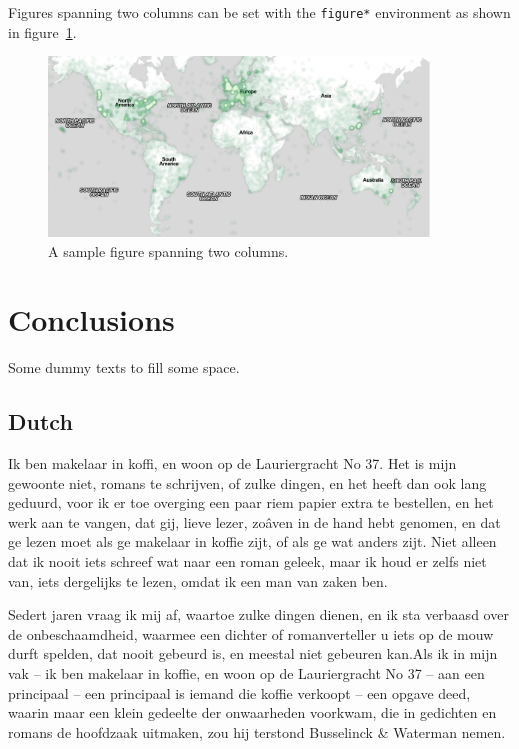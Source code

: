 \documentclass[sigconf]{acmart}
\begin{document}
Figures spanning two columns can be set with the \texttt{figure*} environment as shown in figure~\ref{fig:map2}.

\begin{figure}[tb]
\centering
\includegraphics[width=0.9\textwidth]{map.png}
\caption{A sample figure spanning two columns.}
\label{fig:map2}
\end{figure}


\section{Conclusions}
Some dummy texts to fill some space.

\subsection{Dutch}
Ik ben makelaar in koffi, en woon op de Lauriergracht No 37. Het is mijn gewoonte niet, romans te schrijven, of zulke dingen, en het heeft dan ook lang geduurd, voor ik er toe overging een paar riem papier extra te bestellen, en het werk aan te vangen, dat gij, lieve lezer, zoâven in de hand hebt genomen, en dat ge lezen moet als ge makelaar in koffie zijt, of als ge wat anders zijt. Niet alleen dat ik nooit iets schreef wat naar een roman geleek, maar ik houd er zelfs niet van, iets dergelijks te lezen, omdat ik een man van zaken ben.

Sedert jaren vraag ik mij af, waartoe zulke dingen dienen, en ik sta verbaasd over de onbeschaamdheid, waarmee een dichter of romanverteller u iets op de mouw durft spelden, dat nooit gebeurd is, en meestal niet gebeuren kan.Als ik in mijn vak -- ik ben makelaar in koffie, en woon op de Lauriergracht No 37 -- aan een principaal -- een principaal is iemand die koffie verkoopt -- een opgave deed, waarin maar een klein gedeelte der onwaarheden voorkwam, die in gedichten en romans de hoofdzaak uitmaken, zou hij terstond Busselinck \& Waterman nemen.
\end{document}
